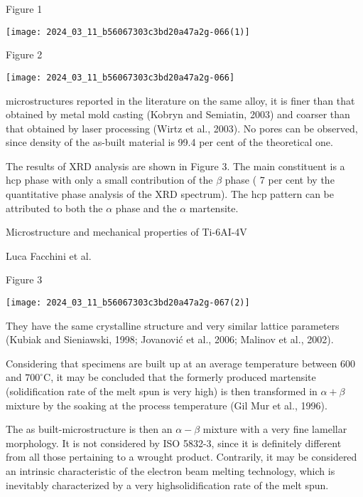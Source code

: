 \documentclass[10pt]{article}
\begin{document}
Figure 1

\begin{center}
\texttt{[image: 2024\_03\_11\_b56067303c3bd20a47a2g-066(1)]}
\end{center}

Figure 2

\begin{center}
\texttt{[image: 2024\_03\_11\_b56067303c3bd20a47a2g-066]}
\end{center}

microstructures reported in the literature on the same alloy, it is finer than that obtained by metal mold casting (Kobryn and Semiatin, 2003) and coarser than that obtained by laser processing (Wirtz et al., 2003). No pores can be observed, since density of the as-built material is 99.4 per cent of the theoretical one.

The results of XRD analysis are shown in Figure 3. The main constituent is a hcp phase with only a small contribution of the $\beta$ phase ( 7 per cent by the quantitative phase analysis of the XRD spectrum). The hcp pattern can be attributed to both the $\alpha$ phase and the $\alpha$ martensite.

Microstructure and mechanical properties of Ti-6AI-4V

Luca Facchini et al.

Figure 3

\begin{center}
\texttt{[image: 2024\_03\_11\_b56067303c3bd20a47a2g-067(2)]}
\end{center}

They have the same crystalline structure and very similar lattice parameters (Kubiak and Sieniawski, 1998; Jovanović et al., 2006; Malinov et al., 2002).

Considering that specimens are built up at an average temperature between 600 and $700^{\circ} \mathrm{C}$, it may be concluded that the formerly produced martensite (solidification rate of the melt spun is very high) is then transformed in $\alpha+\beta$ mixture by the soaking at the process temperature (Gil Mur et al., 1996).

The as built-microstructure is then an $\alpha-\beta$ mixture with a very fine lamellar morphology. It is not considered by ISO 5832-3, since it is definitely different from all those pertaining to a wrought product. Contrarily, it may be considered an intrinsic characteristic of the electron beam melting technology, which is inevitably characterized by a very highsolidification rate of the melt spun.
\end{document}
